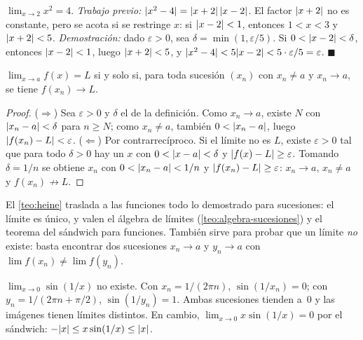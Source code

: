 \begin{ejemplo}\label{ej:cuadratico}
$\lim_{x\to2}x^{2}=4$. \emph{Trabajo previo:} $\lvert x^{2}-4\rvert=\lvert x+2\rvert\,\lvert x-2\rvert$. El factor $\lvert x+2\rvert$ no es constante, pero se acota si se restringe $x$: si $\lvert x-2\rvert<1$, entonces $1<x<3$ y $\lvert x+2\rvert<5$. \emph{Demostración:} dado $\varepsilon>0$, sea $\delta=\min(1,\varepsilon/5)$. Si $0<\lvert x-2\rvert<\delta$, entonces $\lvert x-2\rvert<1$, luego $\lvert x+2\rvert<5$, y $\lvert x^{2}-4\rvert<5\lvert x-2\rvert<5\cdot\varepsilon/5=\varepsilon$. \hfill$\blacksquare$
\end{ejemplo}

\begin{teorema}\label{teo:heine}
$\lim_{x\to a}f(x)=L$ si y solo si, para toda sucesión $(x_n)$ con $x_n\ne a$ y $x_n\to a$, se tiene $f(x_n)\to L$.
\end{teorema}

\begin{proof}
($\Rightarrow$) Sea $\varepsilon>0$ y $\delta$ el de la definición. Como $x_n\to a$, existe $N$ con $\lvert x_n-a\rvert<\delta$ para $n\ge N$; como $x_n\ne a$, también $0<\lvert x_n-a\rvert$, luego $\lvert f(x_n)-L\rvert<\varepsilon$.
($\Leftarrow$) Por contrarrecíproco. Si el límite no es $L$, existe $\varepsilon>0$ tal que para todo $\delta>0$ hay un $x$ con $0<\lvert x-a\rvert<\delta$ y $\lvert f(x)-L\rvert\ge\varepsilon$. Tomando $\delta=1/n$ se obtiene $x_n$ con $0<\lvert x_n-a\rvert<1/n$ y $\lvert f(x_n)-L\rvert\ge\varepsilon$: $x_n\to a$, $x_n\ne a$ y $f(x_n)\not\to L$.
\end{proof}

El \cref{teo:heine} traslada a las funciones todo lo demostrado para sucesiones: el límite es único, y valen el álgebra de límites (\cref{teo:algebra-sucesiones}) y el teorema del sándwich para funciones. También sirve para probar que un límite \emph{no} existe: basta encontrar dos sucesiones $x_n\to a$ y $y_n\to a$ con $\lim f(x_n)\ne\lim f(y_n)$.

\begin{ejemplo}\label{ej:sin1x}
$\lim_{x\to0}\sin(1/x)$ no existe. Con $x_n=1/(2\pi n)$, $\sin(1/x_n)=0$; con $y_n=1/(2\pi n+\pi/2)$, $\sin(1/y_n)=1$. Ambas sucesiones tienden a~0 y las imágenes tienen límites distintos. En cambio, $\lim_{x\to0}x\sin(1/x)=0$ por el sándwich: $-\lvert x\rvert\le x\sin(1/x)\le\lvert x\rvert$.
\end{ejemplo}

